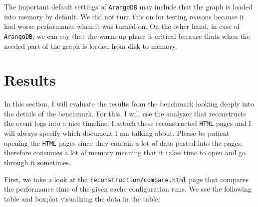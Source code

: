 \documentclass[11pt,a4paper]{article}
\begin{document}
The important default settings of \texttt{ArangoDB} may include that the graph is loaded into memory by default. We did not turn this on for testing reasons because it had worse performance when it was turned on. On the other hand, in case of \texttt{ArangoDB}, we can say that the warm-up phase is critical because thats when the needed part of the graph is loaded from disk to memory.

\section{Results}

In this section, I will evaluate the results from the benchmark looking deeply into the details of the benchmark. For this, I will use the analyzer that reconstructs the event logs into a nice timeline. I attach these reconstructed \texttt{HTML} pages and I will always specify which document I am talking about. Please be patient opening the \texttt{HTML} pages since they contain a lot of data pasted into the pages, therefore consumes a lot of memory meaning that it takes time to open and go through it sometimes.


First, we take a look at the \texttt{reconstruction/compare.html} page that compares the performance time of the given cache configuration runs. We see the following table and boxplot visualizing the data in the table:
\end{document}
